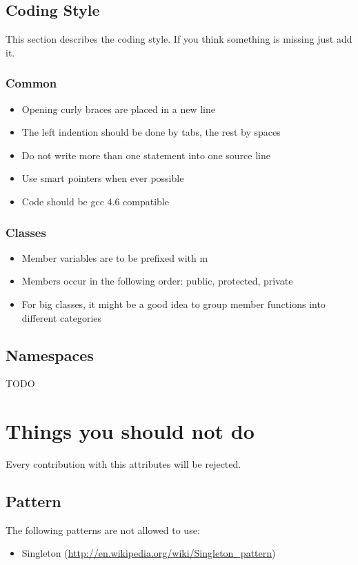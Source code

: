 \documentclass[a4paper]{scrartcl}
\begin{document}
\subsection{Coding Style}
This section describes the coding style. If you think something is missing just add it.


\subsubsection{Common}
\begin{itemize}
	\item Opening curly braces are placed in a new line
	\item The left indention should be done by tabs, the rest by spaces
	\item Do not write more than one statement into one source line
	\item Use smart pointers when ever possible
	\item Code should be gcc 4.6 compatible
\end{itemize}


\subsubsection{Classes}
\begin{itemize}
	\item Member variables are to be prefixed with m
	\item Members occur in the following order: public, protected, private
	\item For big classes, it might be a good idea to group member functions into different categories
\end{itemize}



\subsection{Namespaces}
TODO


\section{Things you should not do}
Every contribution with this attributes will be rejected.



\subsection{Pattern}
The following patterns are not allowed to use:
\begin{itemize}
	\item Singleton (\url{http://en.wikipedia.org/wiki/Singleton_pattern})
\end{itemize}
 
\end{document}
